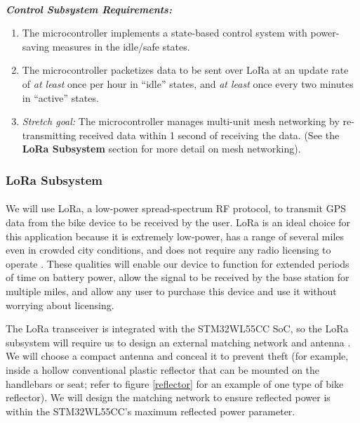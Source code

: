 \documentclass{article}
\begin{document}
\paragraph{} 

\textit{\textbf{Control Subsystem Requirements:}}

\begin{enumerate}
	\item The microcontroller implements a state-based control system with power-saving measures in the idle/safe states. 
	\item The microcontroller packetizes data to be sent over LoRa at an update rate of \textit{at least }once per hour in “idle” states, and \textit{at least} once every two minutes in “active” states. 
	\item \textit{Stretch goal:} The microcontroller manages multi-unit mesh networking by re-transmitting received data within 1 second of receiving the data. (See the \textbf{LoRa Subsystem} section for more detail on mesh networking). 
\end{enumerate}


\subsubsection{LoRa Subsystem}

\paragraph{} We will use LoRa, a low-power spread-spectrum RF protocol, to transmit GPS data from the bike device to be received by the user. LoRa is an ideal choice for this application because it is extremely low-power, has a range of several miles even in crowded city conditions, and does not require any radio licensing to operate \cite{LoRA}. These qualities will enable our device to function for extended periods of time on battery power, allow the signal to be received by the base station for multiple miles, and allow any user to purchase this device and use it without worrying about licensing. 


The LoRa transceiver is integrated with the STM32WL55CC SoC, so the LoRa subsystem will require us to design an external matching network and antenna \cite{matchingAN}. We will choose a compact antenna and conceal it to prevent theft (for example, inside a hollow conventional plastic reflector that can be mounted on the handlebars or seat; refer to figure \ref{reflector} for an example of one type of bike reflector). We will design the matching network to ensure reflected power is within the STM32WL55CC's maximum reflected power parameter.
\end{document}
